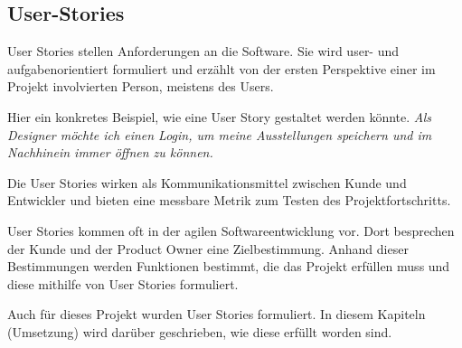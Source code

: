 \subsection{User-Stories}
User Stories stellen Anforderungen an die Software. Sie wird user- und aufgabenorientiert formuliert und erzählt von der ersten Perspektive einer im Projekt involvierten Person, meistens des Users.

Hier ein konkretes Beispiel, wie eine User Story gestaltet werden könnte.
\emph{Als Designer möchte ich einen Login, um meine Ausstellungen speichern und im Nachhinein immer öffnen zu können.}

Die User Stories wirken als Kommunikationsmittel zwischen Kunde und Entwickler und bieten eine messbare Metrik zum Testen des Projektfortschritts.

User Stories kommen oft in der agilen Softwareentwicklung vor. Dort besprechen der Kunde und der Product Owner eine Zielbestimmung. Anhand dieser Bestimmungen werden Funktionen bestimmt, die das Projekt erfüllen muss und diese mithilfe von User Stories formuliert.
\cite{AgileVorgehensmodelle}

Auch für dieses Projekt wurden User Stories formuliert. In diesem Kapiteln (Umsetzung) wird darüber geschrieben, wie diese erfüllt worden sind. 


